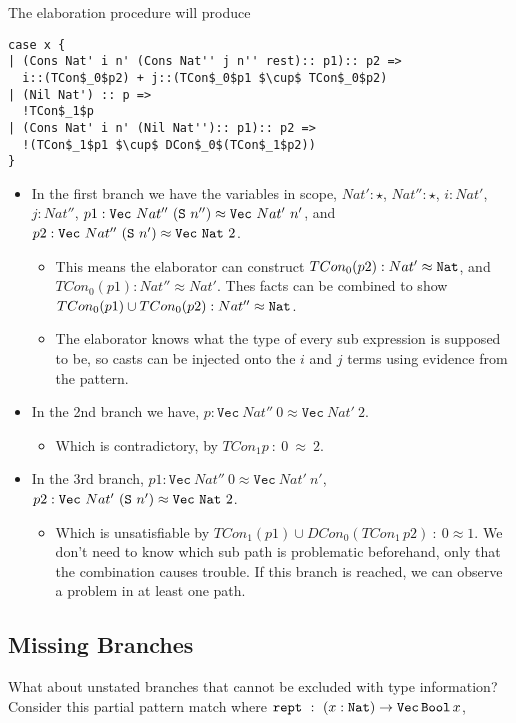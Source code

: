 The elaboration procedure will produce
 
\begin{lstlisting}[basicstyle={\ttfamily\small}]
case x {
| (Cons Nat' i n' (Cons Nat'' j n'' rest):: p1):: p2 =>
  i::(TCon$_0$p2) + j::(TCon$_0$p1 $\cup$ TCon$_0$p2)
| (Nil Nat') :: p =>
  !TCon$_1$p
| (Cons Nat' i n' (Nil Nat''):: p1):: p2 =>
  !(TCon$_1$p1 $\cup$ DCon$_0$(TCon$_1$p2))
}
\end{lstlisting}
 
\begin{itemize}
\item
In the first branch we have the variables in scope, $Nat':\star$, $Nat'':\star$, $i:Nat'$, $j:Nat''$, $p1:\mathtt{Vec}\ Nat''\ (\Suc{}\ n'')\approx\mathtt{Vec}\ Nat'\ n'$, and $p2:\mathtt{Vec}\ Nat''\ (\Suc{}\ n')\approx\mathtt{Vec}\ \Nat{}\ 2$.
\begin{itemize}
\item
This means the elaborator can construct $TCon_0(p2):Nat'\approx\mathtt{Nat}{}$, and $TCon_0(p1):Nat''\approx Nat'$.
Thes facts can be combined to show $TCon_0(p1) \cup TCon_0(p2):Nat''\approx\mathtt{Nat}{}$.
\item
The elaborator knows what the type of every sub expression is supposed to be, so casts can be injected onto the $i$ and $j$ terms using evidence from the pattern.
\end{itemize}
\item
In the 2nd branch we have, $p:\mathtt{Vec}\ Nat''\ 0\approx\mathtt{Vec}\ Nat'\ 2$.
\begin{itemize}
\item
Which is contradictory, by $TCon_1p\ :\ 0\ \approx\ 2$.
\end{itemize}
\item
{}
In the 3rd branch, $p1:\mathtt{Vec}\ Nat''\ 0\approx\mathtt{Vec}\ Nat'\ n'$, $p2:\mathtt{Vec}\ Nat'\ (\Suc{}\ n')\approx\mathtt{Vec}\ \Nat{}\ 2$.
\begin{itemize}
\item
Which is unsatisfiable by $TCon_1(p1) \cup DCon_0(TCon_1\,p2)\ :\ 0\approx1$.
We don't need to know which sub path is problematic beforehand, only that the combination causes trouble.
If this branch is reached, we can observe a problem in at least one path.
\end{itemize}
\end{itemize}
 
\subsection{Missing Branches}
What about unstated branches that cannot be excluded with type information?
Consider this partial pattern match where $\mathtt{rept}\ :\ (x: \mathtt{Nat}{}) \rightarrow \mathtt{Vec}{}\,\mathtt{Bool}{}\,x$,
 

